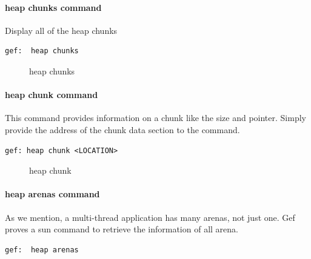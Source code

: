 \documentclass{masterthesis}
\begin{document}
\paragraph{heap chunks command}

Display all of the heap chunks
\begin{lstlisting}[frame=tlrb]
gef:  heap chunks
\end{lstlisting}

 \begin{figure}[h!]
  \caption{heap chunks}
\end{figure}


\paragraph{heap chunk command}
This command provides information on a chunk like the size and pointer. Simply provide the address of the chunk data section to the command.
\begin{lstlisting}[frame=tlrb]
gef: heap chunk <LOCATION>
\end{lstlisting}

 \begin{figure}[h!]
  \caption{heap chunk}
\end{figure}

\paragraph{heap arenas command}
As we mention, a multi-thread application has many arenas, not just one. Gef proves a sun command to retrieve the information of all arena.

\begin{lstlisting}[frame=tlrb]
gef:  heap arenas
\end{lstlisting}
\end{document}
